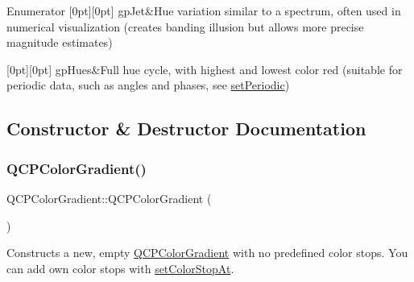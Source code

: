 \begin{DoxyEnumFields}{Enumerator}
[0pt][0pt]{}\mbox{\label{class_q_c_p_color_gradient_aed6569828fee337023670272910c9072a5f8a9e67b64c17ddfe4f069fe2b9fb02}} 
gp\+Jet&Hue variation similar to a spectrum, often used in numerical visualization (creates banding illusion but allows more precise magnitude estimates) \\
\hline

[0pt][0pt]{}\mbox{\label{class_q_c_p_color_gradient_aed6569828fee337023670272910c9072a30efe58407acfb67939032f70213a130}} 
gp\+Hues&Full hue cycle, with highest and lowest color red (suitable for periodic data, such as angles and phases, see \mbox{\hyperlink{class_q_c_p_color_gradient_a39d6448155fc00a219f239220d14bb39}{set\+Periodic}}) \\
\hline

\end{DoxyEnumFields}


\subsection{Constructor \& Destructor Documentation}
\mbox{\label{class_q_c_p_color_gradient_a96bcc490ff9dc32b22941ce00800bce0}} 
\subsubsection{\texorpdfstring{QCPColorGradient()}{QCPColorGradient()}\hspace{0.1cm}{\footnotesize\ttfamily [1/2]}}
{\footnotesize\ttfamily Q\+C\+P\+Color\+Gradient\+::\+Q\+C\+P\+Color\+Gradient (\begin{DoxyParamCaption}{ }\end{DoxyParamCaption})}

Constructs a new, empty \mbox{\hyperlink{class_q_c_p_color_gradient}{Q\+C\+P\+Color\+Gradient}} with no predefined color stops. You can add own color stops with \mbox{\hyperlink{class_q_c_p_color_gradient_a3b48be5e78079db1bb2a1188a4c3390e}{set\+Color\+Stop\+At}}.

